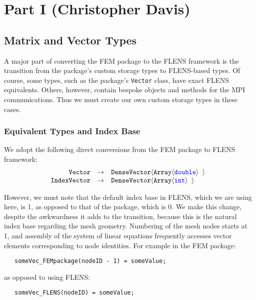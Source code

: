 \section{Part I (Christopher Davis)}

\subsection{Matrix and Vector Types}

A major part of converting the FEM package to the FLENS framework is the transition from the package's custom storage types to FLENS-based types. Of course, some types, such as the package's \texttt{Vector} class, have exact FLENS equivalents. Others, however, contain bespoke objects and methods for the MPI communications. Thus we must create our own custom storage types in these cases.

\subsubsection{Equivalent Types and Index Base}

We adopt the following direct conversions from the FEM package to FLENS framework:
\begin{equation*}
\begin{array}{rcl}
   \mbox{\texttt{Vector}}  &  \rightarrow  &  \mbox{\texttt{DenseVector$\langle$Array$\langle${\color{blue}double}$\rangle$ $\rangle$}} \\
   \mbox{\texttt{IndexVector}} & \rightarrow & \mbox{\texttt{DenseVector$\langle$Array$\langle${\color{blue}int}$\rangle$ $\rangle$}}
\end{array}
\end{equation*}

However, we must note that the default index base in FLENS, which we are using here, is 1, as opposed to that of the package, which is 0. We make this change, despite the awkwardness it adds to the transition, because this is the natural index base regarding the mesh geometry. Numbering of the mesh nodes starts at 1, and assembly of the system of linear equations frequently accesses vector elements corresponding to node identities. For example in the FEM package:

\begin{lstlisting}
   someVec_FEMpackage(nodeID - 1) = someValue;
\end{lstlisting}

as opposed to using FLENS:

\begin{lstlisting}
   someVec_FLENS(nodeID) = someValue;
\end{lstlisting}

